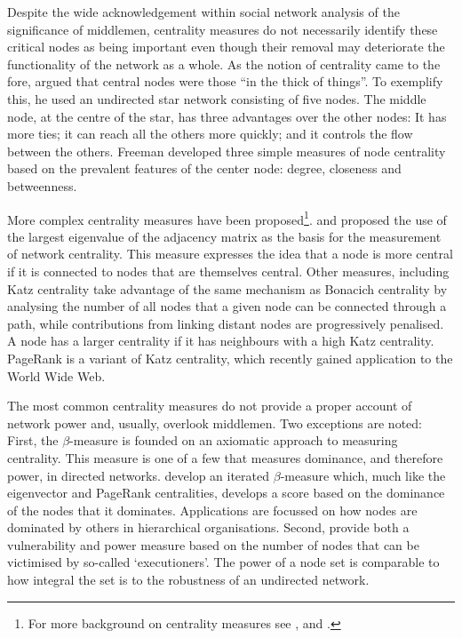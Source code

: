 \documentclass[11pt,fleqn]{article}
\begin{document}
Despite the wide acknowledgement within social network analysis of the significance of middlemen, centrality measures do not necessarily identify these critical nodes as being important even though their removal may deteriorate the functionality of the network as a whole. As the notion of centrality came to the fore, \citet[p.~219]{Freeman1979} argued that central nodes were those ``in the thick of things''. To exemplify this, he used an undirected star network consisting of five nodes. The middle node, at the centre of the star, has three advantages over the other nodes: It has more ties; it can reach all the others more quickly; and it controls the flow between the others. Freeman developed three simple measures of node centrality based on the prevalent features of the center node: degree, closeness and betweenness.

More complex centrality measures have been proposed\footnote{For more background on centrality measures see \citet{Borgatti2005}, \citet[Chapter~4]{WassermanFaust1994} and \citet[Chapter~2.2]{Jackson2008}.}. \citet{Bonacich1972,Bonacich1987} and \citet{Bonacich2001} proposed the use of the largest eigenvalue of the adjacency matrix as the basis for the measurement of network centrality. This measure expresses the idea that a node is more central if it is connected to nodes that are themselves central. Other measures, including Katz centrality \citep{Katz1953} take advantage of the same mechanism as Bonacich centrality by analysing the number of all nodes that a given node can be connected through a path, while contributions from linking distant nodes are progressively penalised. A node has a larger centrality if it has neighbours with a high Katz centrality. PageRank \citep{BrinPage1998} is a variant of Katz centrality, which recently gained application to the World Wide Web.

The most common centrality measures do not provide a proper account of network power and, usually, overlook middlemen. Two exceptions are noted: First, the $\beta$-measure \citep{BrinkGilles1996, BrinkGilles2000} is founded on an axiomatic approach to measuring centrality. This measure is one of a few that measures dominance, and therefore power, in directed networks. \citet{BormBrink2002} develop an iterated $\beta$-measure which, much like the eigenvector and PageRank centralities, develops a score based on the dominance of the nodes that it dominates. Applications are focussed on how nodes are dominated by others in hierarchical organisations. Second, \citet{Bozzo2015} provide both a vulnerability and power measure based on the number of nodes that can be victimised by so-called `executioners'. The power of a node set is comparable to how integral the set is to the robustness of an undirected network.
\end{document}
